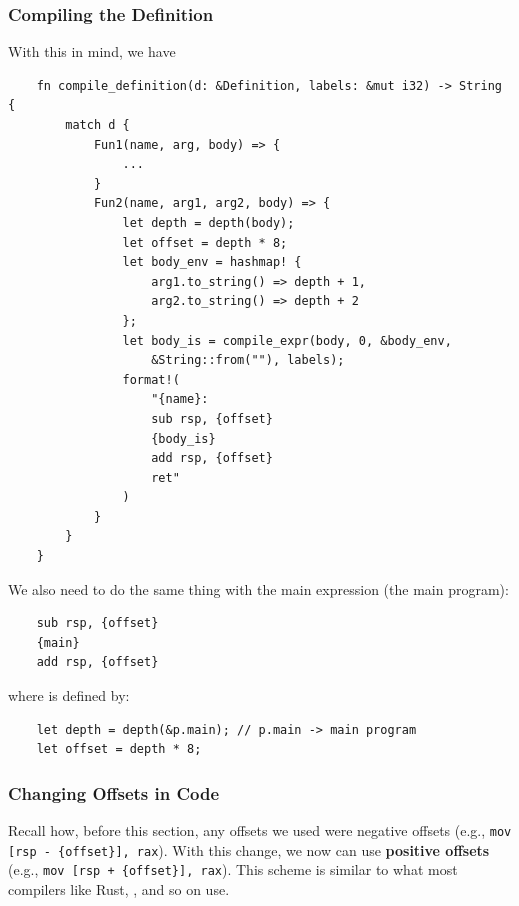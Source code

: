 \documentclass[letterpaper]{article}
\begin{document}
\subsubsection{Compiling the Definition}
With this in mind, we have 
\begin{verbatim}
    fn compile_definition(d: &Definition, labels: &mut i32) -> String {
        match d {
            Fun1(name, arg, body) => {
                ...
            }
            Fun2(name, arg1, arg2, body) => {
                let depth = depth(body);
                let offset = depth * 8;
                let body_env = hashmap! {
                    arg1.to_string() => depth + 1,
                    arg2.to_string() => depth + 2
                };
                let body_is = compile_expr(body, 0, &body_env, 
                    &String::from(""), labels);
                format!(
                    "{name}:
                    sub rsp, {offset}
                    {body_is}
                    add rsp, {offset}
                    ret"
                )
            }
        }
    }\end{verbatim}
We also need to do the same thing with the main expression (the main program):
\begin{verbatim}
    sub rsp, {offset}
    {main}
    add rsp, {offset}\end{verbatim}
where  is defined by: 
\begin{verbatim}
    let depth = depth(&p.main); // p.main -> main program
    let offset = depth * 8;\end{verbatim}

\subsubsection{Changing Offsets in Code}
Recall how, before this section, any offsets we used were negative offsets (e.g., \verb|mov [rsp - {offset}], rax|). With this change, we now can use \textbf{positive offsets} (e.g., \verb|mov [rsp + {offset}], rax|). This scheme is similar to what most compilers like Rust, , and so on use. 

\end{document}
